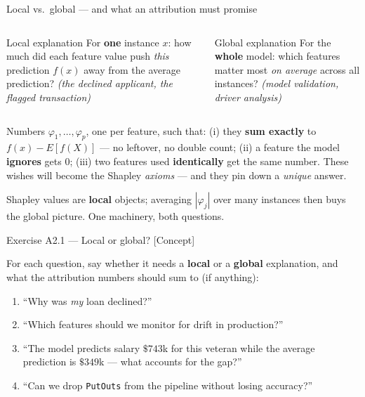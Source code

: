 \documentclass[aspectratio=169,11pt]{beamer}
\begin{document}
\begin{frame}{Local vs.\ global --- and what an attribution must promise}
  \footnotesize
  \begin{columns}[T]
    \begin{block}{Local explanation}
      For \textbf{one} instance $x$: how much did each feature value push
      \emph{this} prediction $f(x)$ away from the average prediction?
      \emph{(the declined applicant, the flagged transaction)}
    \end{block}
    \begin{block}{Global explanation}
      For the \textbf{whole} model: which features matter most \emph{on
      average} across all instances? \emph{(model validation, driver analysis)}
    \end{block}
  \end{columns}
  \vspace{2pt}
  \begin{readme}
    Numbers $\varphi_1,\dots,\varphi_p$, one per feature, such that:
    (i) they \textbf{sum exactly} to $f(x)-E[f(X)]$ --- no leftover, no double count;
    (ii) a feature the model \textbf{ignores} gets $0$;
    (iii) two features used \textbf{identically} get the same number.
    These wishes will become the Shapley \emph{axioms} --- and they pin down a
    \emph{unique} answer.
  \end{readme}
  \begin{takeaway}
    Shapley values are \textbf{local} objects; averaging $|\varphi_j|$ over many
    instances then buys the global picture. One machinery, both questions.
  \end{takeaway}
\end{frame}

\begin{frame}{Exercise A2.1 --- Local or global? [Concept]}
\begin{exercise}
  For each question, say whether it needs a \textbf{local} or a \textbf{global}
  explanation, and what the attribution numbers should sum to (if anything):
  \begin{enumerate}
    \item ``Why was \emph{my} loan declined?''
    \item ``Which features should we monitor for drift in production?''
    \item ``The model predicts salary $\$743$k for this veteran while the average
          prediction is $\$349$k --- what accounts for the gap?''
    \item ``Can we drop \texttt{PutOuts} from the pipeline without losing accuracy?''
  \end{enumerate}
\end{exercise}
\end{frame}
\end{document}

